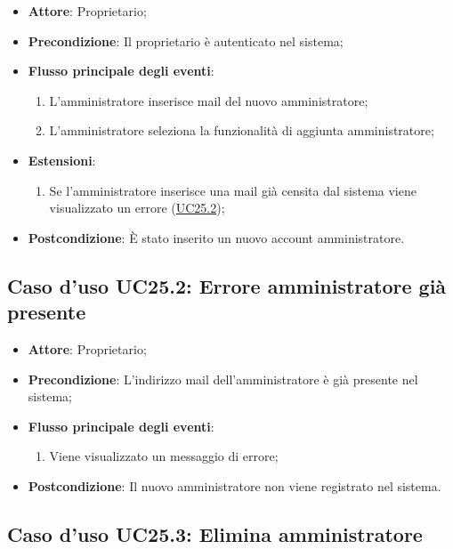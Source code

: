 \documentclass[12pt,a4paper]{article}
\begin{document}
\begin{itemize}

\item \textbf{Attore}: Proprietario; 
\item \textbf{Precondizione}: Il proprietario è autenticato nel sistema;

\item \textbf{Flusso principale degli eventi}:
\begin{enumerate}
	\item L'amministratore inserisce mail del nuovo amministratore;
	\item L'amministratore seleziona la funzionalità di aggiunta amministratore;
	
\end{enumerate}
\item \textbf{Estensioni}:
\begin{enumerate}
	\item Se l’amministratore inserisce una mail già censita dal sistema viene visualizzato un errore (\hyperlink{UC25.2}{UC25.2});
	
\end{enumerate}
\item \textbf{Postcondizione}: È stato inserito un nuovo account amministratore.
\end{itemize}
\hypertarget{UC25.2}{}
\subsection{Caso d'uso UC25.2: Errore amministratore già presente}

\begin{itemize}

\item \textbf{Attore}: Proprietario; 
\item \textbf{Precondizione}: L'indirizzo mail dell'amministratore è già presente nel sistema;

\item \textbf{Flusso principale degli eventi}:
\begin{enumerate}
	\item Viene visualizzato un messaggio di errore;
	
\end{enumerate}
\item \textbf{Postcondizione}: Il nuovo amministratore non viene registrato nel sistema.
\end{itemize}
\hypertarget{UC25.3}{}
\subsection{Caso d'uso UC25.3: Elimina amministratore}
\end{document}
